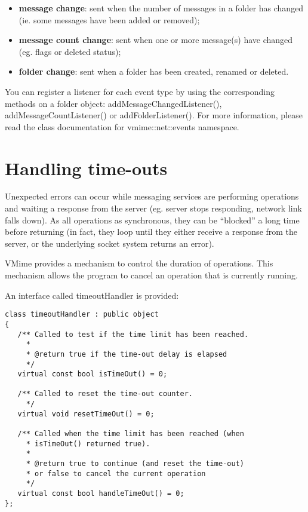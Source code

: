 \begin{itemize}
\item {\bf message change}: sent when the number of messages in a folder
has changed (ie. some messages have been added or removed);
\item {\bf message count change}: sent when one or more message(s) have
changed (eg. flags or deleted status);
\item {\bf folder change}: sent when a folder has been created, renamed or
deleted.
\end{itemize}

You can register a listener for each event type by using the corresponding
methods on a {\vcode folder} object: {\vcode addMessageChangedListener()},
{\vcode addMessageCountListener()} or {\vcode addFolderListener()}. For more
information, please read the class documentation for
{\vcode vmime::net::events} namespace.


\section{Handling time-outs}

Unexpected errors can occur while messaging services are performing
operations and waiting a response from the server (eg. server stops
responding, network link falls down). As all operations as synchronous,
they can be ``blocked'' a long time before returning (in fact, they loop
until they either receive a response from the server, or the underlying
socket system returns an error).

VMime provides a mechanism to control the duration of operations. This
mechanism allows the program to cancel an operation that is currently
running.

An interface called {\vcode timeoutHandler} is provided:

\begin{lstlisting}
class timeoutHandler : public object
{
   /** Called to test if the time limit has been reached.
     *
     * @return true if the time-out delay is elapsed
     */
   virtual const bool isTimeOut() = 0;

   /** Called to reset the time-out counter.
     */
   virtual void resetTimeOut() = 0;

   /** Called when the time limit has been reached (when
     * isTimeOut() returned true).
     *
     * @return true to continue (and reset the time-out)
     * or false to cancel the current operation
     */
   virtual const bool handleTimeOut() = 0;
};
\end{lstlisting}

